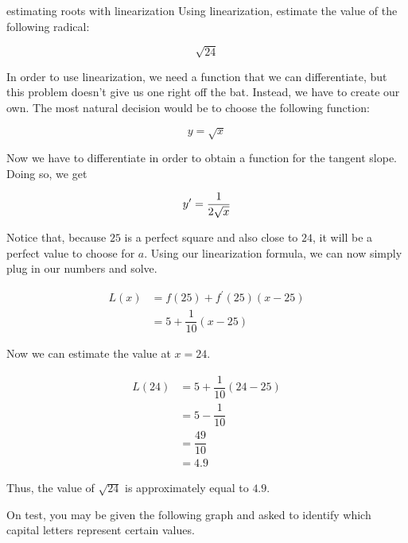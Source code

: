 \begin{example}{estimating roots with linearization}
    Using linearization, estimate the value of the following radical:
    
    \[ \sqrt{24} \]
    
    \vspace{0.3cm}
    
    In order to use linearization, we need a function that we can differentiate, but this problem doesn't give us one right off the bat. Instead, we have to create our own. The most natural decision would be to choose the following function:
    
    \[ y = \sqrt{x} \]
    
    Now we have to differentiate in order to obtain a function for the tangent slope. Doing so, we get
    
    \[ y^\prime = \dfrac{1}{2 \sqrt{x}} \]
    
    Notice that, because \( 25 \) is a perfect square and also close to \( 24 \), it will be a perfect value to choose for \( a \). Using our linearization formula, we can now simply plug in our numbers and solve.
    
    \begin{align}
        L \left( x \right) &= f \left( 25 \right) + f^\prime \left( 25 \right) \left( x - 25 \right) \\
        &= 5 + \dfrac{1}{10} \left( x - 25 \right)
    \end{align}
    
    Now we can estimate the value at \( x = 24 \).
    
    \begin{align}
        L \left( 24 \right) &= 5 + \dfrac{1}{10} \left( 24 - 25 \right) \\
        &= 5 - \dfrac{1}{10} \\
        &= \dfrac{49}{10} \\
        &= 4.9
    \end{align}
    
    Thus, the value of \( \sqrt{24} \) is approximately equal to \( 4.9 \).
\end{example}

On test, you may be given the following graph and asked to identify which capital letters represent certain values.

\begin{figure}[H]
    \centering
    
\end{figure}


